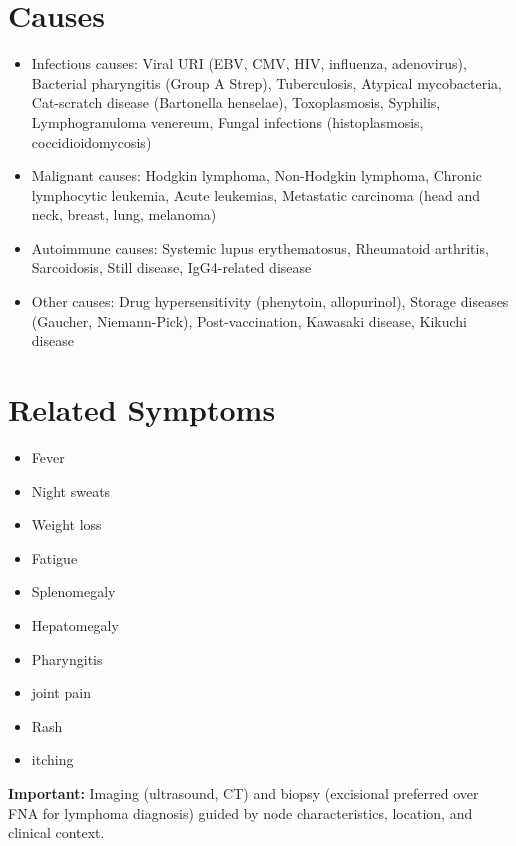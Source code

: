 \section*{Causes}
\begin{itemize}
  \item Infectious causes: Viral URI (EBV, CMV, HIV, influenza, adenovirus), Bacterial pharyngitis (Group A Strep), Tuberculosis, Atypical mycobacteria, Cat-scratch disease (Bartonella henselae), Toxoplasmosis, Syphilis, Lymphogranuloma venereum, Fungal infections (histoplasmosis, coccidioidomycosis)
  \item Malignant causes: Hodgkin lymphoma, Non-Hodgkin lymphoma, Chronic lymphocytic leukemia, Acute leukemias, Metastatic carcinoma (head and neck, breast, lung, melanoma)
  \item Autoimmune causes: Systemic lupus erythematosus, Rheumatoid arthritis, Sarcoidosis, Still disease, IgG4-related disease
  \item Other causes: Drug hypersensitivity (phenytoin, allopurinol), Storage diseases (Gaucher, Niemann-Pick), Post-vaccination, Kawasaki disease, Kikuchi disease
\end{itemize}

\section*{Related Symptoms}
\begin{itemize}
  \item Fever
  \item Night sweats
  \item Weight loss
  \item Fatigue
  \item Splenomegaly
  \item Hepatomegaly
  \item Pharyngitis
  \item joint pain
  \item Rash
  \item itching
\end{itemize}
\textbf{Important:} Imaging (ultrasound, CT) and biopsy (excisional preferred over FNA for lymphoma diagnosis) guided by node characteristics, location, and clinical context.

